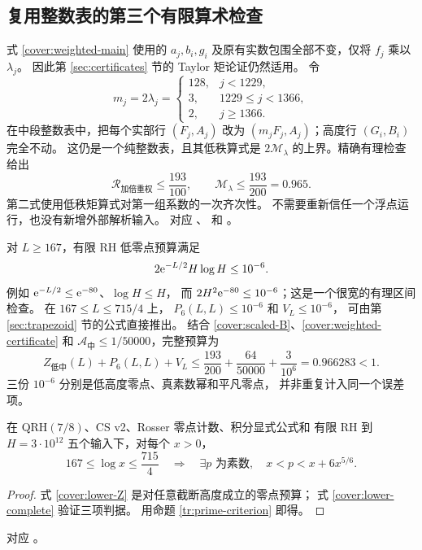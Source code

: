 \subsection{复用整数表的第三个有限算术检查}

式 \eqref{cover:weighted-main} 使用的 $a_j,b_i,g_i$
及原有实数包围全部不变，仅将 $f_j$ 乘以 $\lambda_j$。
因此第 \ref{sec:certificates} 节的 Taylor 矩论证仍然适用。
令
\[
 m_j=2\lambda_j=
 \begin{cases}
 128,&j<1229,\\
 3,&1229\leq j<1366,\\
 2,&j\geq1366.
 \end{cases}
\]
在中段整数表中，把每个实部行 $(F_j,A_j)$ 改为
$(m_jF_j,A_j)$；高度行 $(G_i,B_i)$ 完全不动。
这仍是一个纯整数表，且其低秩算式是
$2\mathcal M_\lambda$ 的上界。精确有理检查给出
\begin{equation}\label{cover:weighted-certificate}
 \mathcal R_{\text{加倍重权}}\leq\frac{193}{100},
 \qquad
 \mathcal M_\lambda\leq\frac{193}{200}=0.965.
\end{equation}
第二式使用低秩矩算式对第一组系数的一次齐次性。
不需要重新信任一个浮点运行，也没有新增外部解析输入。
对应 、
和 。

对 $L\geq167$，有限 RH 低零点预算满足
\begin{equation}\label{cover:low-small}
 2\mathrm e^{-L/2}H\log H\leq10^{-6}.
\end{equation}
例如 $\mathrm e^{-L/2}\leq\mathrm e^{-80}$、$\log H\leq H$，
而 $2H^2\mathrm e^{-80}\leq10^{-6}$；这是一个很宽的有理区间检查。
在 $167\leq L\leq715/4$ 上，
$P_6(L,L)\leq10^{-6}$ 和 $V_L\leq10^{-6}$，
可由第 \ref{sec:trapezoid} 节的公式直接推出。
结合 \eqref{cover:scaled-B}、\eqref{cover:weighted-certificate}
和 $\mathcal A_{\text{中}}\leq1/50000$，完整预算为
\begin{equation}\label{cover:lower-complete}
 Z_{\text{低中}}(L)+P_6(L,L)+V_L
 \leq\frac{193}{200}+\frac{64}{50000}+\frac3{10^6}
 =0.966283<1.
\end{equation}
三份 $10^{-6}$ 分别是低高度零点、真素数幂和平凡零点，
并非重复计入同一个误差项。

\begin{proposition}[下中段覆盖]\label{cover:lower-range}
在 QRH$(7/8)$、CS v2、Rosser 零点计数、积分显式公式和
有限 RH 到 $H=3\cdot10^{12}$ 五个输入下，对每个 $x>0$，
\[
 167\leq\log x\leq\frac{715}{4}
 \quad\Longrightarrow\quad
 \exists p\text{ 为素数},\quad x<p<x+6x^{5/6}.
\]
\end{proposition}
\begin{proof}
式 \eqref{cover:lower-Z} 是对任意截断高度成立的零点预算；
式 \eqref{cover:lower-complete} 验证三项判据。
用命题 \ref{tr:prime-criterion} 即得。
\end{proof}
对应 。

